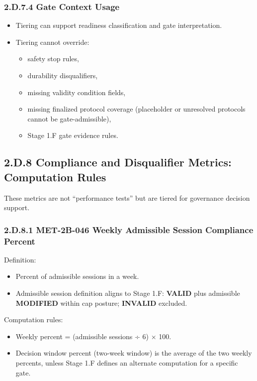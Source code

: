 \documentclass[10pt]{article}
\begin{document}
\subsubsection*{2.D.7.4 Gate Context Usage}

\begin{itemize}
\item Tiering can support readiness classification and gate interpretation.
\item Tiering cannot override:
  \begin{itemize}
  \item safety stop rules,
  \item durability disqualifiers,
  \item missing validity condition fields,
  \item missing finalized protocol coverage (placeholder or unresolved protocols cannot be gate-admissible),
  \item Stage 1.F gate evidence rules.
  \end{itemize}
\end{itemize}

\clearpage
\subsection*{2.D.8 Compliance and Disqualifier Metrics: Computation Rules}
{}

These metrics are not “performance tests” but are tiered for governance decision support.

\subsubsection*{2.D.8.1 \textbf{MET-2B-046} Weekly Admissible Session Compliance Percent}

Definition:

\begin{itemize}
\item Percent of admissible sessions in a week.
\item Admissible session definition aligns to Stage 1.F: \textbf{VALID} plus admissible \textbf{MODIFIED} within cap posture; \textbf{INVALID} excluded.
\end{itemize}

Computation rules:

\begin{itemize}
\item Weekly percent = (admissible sessions ÷ 6) × 100.
\item Decision window percent (two-week window) is the average of the two weekly percents, unless Stage 1.F defines an alternate computation for a specific gate.
\end{itemize}
\end{document}
